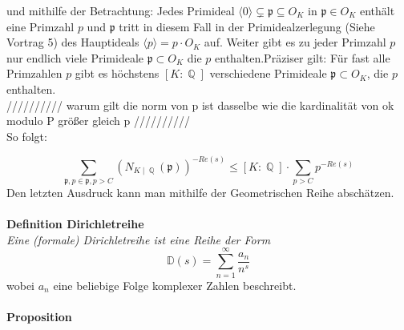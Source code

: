 \documentclass[10pt,a4paper]{article}
\DeclareMathOperator{\Q}{\mathbb{Q}}
\begin{document}
und mithilfe der Betrachtung: Jedes Primideal $\langle0\rangle\subsetneq \mathfrak{p} \subseteq O_{\textit{K}}$ in $\mathfrak{p} \in O_K$ enthält eine Primzahl $p$ und $\mathfrak{p}$ tritt in diesem Fall in der Primidealzerlegung (Siehe Vortrag 5) des Hauptideals $\langle p \rangle=p\cdot O_K$ auf. Weiter gibt es zu jeder Primzahl $p$ nur endlich viele Primideale $\mathfrak{p}\subset O_K$ die $p$ enthalten.Präziser gilt: Für fast alle Primzahlen $p$ gibt es höchstens $[K\colon \Q]$ verschiedene Primideale $\mathfrak{p}\subset O_K$, die $p$ enthalten. 
\\
////////// warum gilt die norm von p ist dasselbe wie die kardinalität von ok modulo P größer gleich p
//////////
\\
So folgt:

$$\sum_{\mathfrak{p},p\in \mathfrak{p},p>C}(N_{K\mid \Q}(\mathfrak{p}))^{-Re(s)} \leq [K\colon\Q]\cdot \sum_{p>C}p^{-Re(s)} $$Den letzten Ausdruck kann man mithilfe der Geometrischen Reihe abschätzen.
\\
\\
\textbf{Definition Dirichletreihe}
\\
\textit{Eine (formale) Dirichletreihe ist eine Reihe der Form $$\mathbb{D}(s) = \sum_{n =1}^{\infty}\frac{a_n}{n^s} $$}wobei $a_n$ eine beliebige Folge komplexer Zahlen beschreibt.
\\
\\
\textbf{Proposition}
\\
\end{document}
